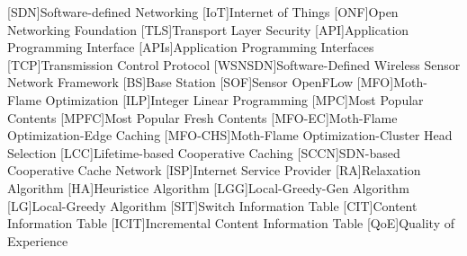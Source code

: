 \documentclass[conference]{IEEEtran}
\begin{document}
	\printbibliography
	\begin{acronym}
		[SDN]{Software-defined Networking}
		[IoT]{Internet of Things}
		[ONF]{Open Networking Foundation}
		[TLS]{Transport Layer Security}
		[API]{Application Programming Interface}
		{Application Programming Interfaces}
		[TCP]{Transmission Control Protocol}
		[WSNSDN]{Software-Defined Wireless Sensor Network Framework }
		[BS]{Base Station}
		[SOF]{Sensor OpenFLow}
		[MFO]{Moth-Flame Optimization}
		[ILP]{Integer Linear Programming}
		[MPC]{Most Popular Contents}
		{Most Popular Fresh Contents}
		[MFO-EC]{Moth-Flame Optimization-Edge Caching}
		[MFO-CHS]{Moth-Flame Optimization-Cluster Head Selection}
		[LCC]{Lifetime-based Cooperative Caching}
		{SDN-based Cooperative Cache Network}
		[ISP]{Internet Service Provider}
		[RA]{Relaxation Algorithm}
		[HA]{Heuristice Algorithm}
		[LGG]{Local-Greedy-Gen Algorithm}
		[LG]{Local-Greedy Algorithm}
		[SIT]{Switch Information Table}
		[CIT]{Content Information Table}
		{Incremental Content Information Table}
		[QoE]{Quality of Experience}
	\end{acronym}

\end{document}
